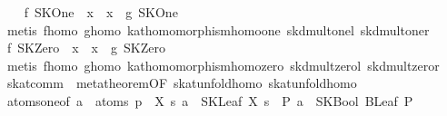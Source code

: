 \begin{isabellebody}
\isanewline
{}\isamarkupfalse%
\isanewline
\ \ \isamarkupfalse%
\ {}f\ SKOne\ {}\ x\ {}\ x\ {}\ g\ SKOne{}\isanewline
\ \ \ \ \isamarkupfalse%
\ {}metis\ f{}homo\ g{}homo\ kat{}homomorphism{}homo{}one\ skd{}mult{}onel\ skd{}mult{}oner{}\isanewline
{}\isamarkupfalse%
\isanewline
\ \ \isamarkupfalse%
\ {}f\ SKZero\ {}\ x\ {}\ x\ {}\ g\ SKZero{}\isanewline
\ \ \ \ \isamarkupfalse%
\ {}metis\ f{}homo\ g{}homo\ kat{}homomorphism{}homo{}zero\ skd{}mult{}zerol\ skd{}mult{}zeror{}\isanewline
{}\isamarkupfalse%
%
\endisatagproof
{\isafoldproof}%
%
\isadelimproof
\isanewline
%
\endisadelimproof
\isanewline
{}\isamarkupfalse%
\ skat{}comm\ {}\ metatheorem{}OF\ skat{}unfold{}homo\ skat{}unfold{}homo{}\isanewline
\isanewline
{}\isamarkupfalse%
\ atoms{}oneof{}\ {}a\ {}\ atoms\ p\ {}\ {}{}X\ s{}\ a\ {}\ SKLeaf\ X\ s{}\ {}\ {}{}P{}\ a\ {}\ SKBool\ {}BLeaf\ P{}{}{}\isanewline

\end{isabellebody}
